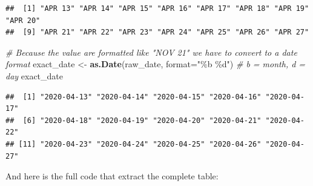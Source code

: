 \documentclass[
]{book}
\newenvironment{Shaded}{\begin{snugshade}}{\end{snugshade}}
\newcommand{\CommentTok}[1]{\textcolor[rgb]{0.56,0.35,0.01}{\textit{#1}}}
\newcommand{\DataTypeTok}[1]{\textcolor[rgb]{0.13,0.29,0.53}{#1}}
\newcommand{\KeywordTok}[1]{\textcolor[rgb]{0.13,0.29,0.53}{\textbf{#1}}}
\newcommand{\NormalTok}[1]{#1}
\newcommand{\StringTok}[1]{\textcolor[rgb]{0.31,0.60,0.02}{#1}}
\begin{document}
\begin{verbatim}
##  [1] "APR 13" "APR 14" "APR 15" "APR 16" "APR 17" "APR 18" "APR 19" "APR 20"
##  [9] "APR 21" "APR 22" "APR 23" "APR 24" "APR 25" "APR 26" "APR 27"
\end{verbatim}

\begin{Shaded}
\begin{Highlighting}[]
\CommentTok{\# Because the value are formatted like "NOV 21" we have to convert to a date format}
\NormalTok{exact\_date \textless{}{-}}\StringTok{ }\KeywordTok{as.Date}\NormalTok{(raw\_date, }\DataTypeTok{format=}\StringTok{"\%b \%d"}\NormalTok{) }\CommentTok{\# b = month, d = day}
\NormalTok{exact\_date}
\end{Highlighting}
\end{Shaded}

\begin{verbatim}
##  [1] "2020-04-13" "2020-04-14" "2020-04-15" "2020-04-16" "2020-04-17"
##  [6] "2020-04-18" "2020-04-19" "2020-04-20" "2020-04-21" "2020-04-22"
## [11] "2020-04-23" "2020-04-24" "2020-04-25" "2020-04-26" "2020-04-27"
\end{verbatim}

And here is the full code that extract the complete table:
\end{document}
